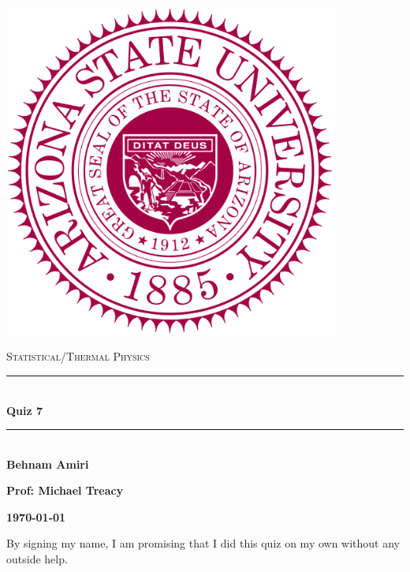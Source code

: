 \documentclass[fleqn]{article}
\begin{document}
  \begin{titlepage}

    \newcommand{\HRule}{\rule{\linewidth}{0.5mm}}

    \center

    \begin{center}
      \includegraphics[height=11cm, width=11cm]{asu.png}
    \end{center}

    \vline

    \textsc{\LARGE Statistical/Thermal Physics}\\[1.5cm]

    \HRule \\[0.5cm]
    { \huge \bfseries Quiz 7}\\[0.4cm] 
    \HRule \\[1.0cm]

    \textbf{Behnam Amiri}

    \bigbreak

    \textbf{Prof: Michael Treacy}

    \bigbreak

    \textbf{{\large \today}\\[2cm]}

    \vfill

  \end{titlepage}

  By signing my name, I am promising that I did this quiz on my own without any outside help.

  \vspace{0.5cm}
\end{document}
